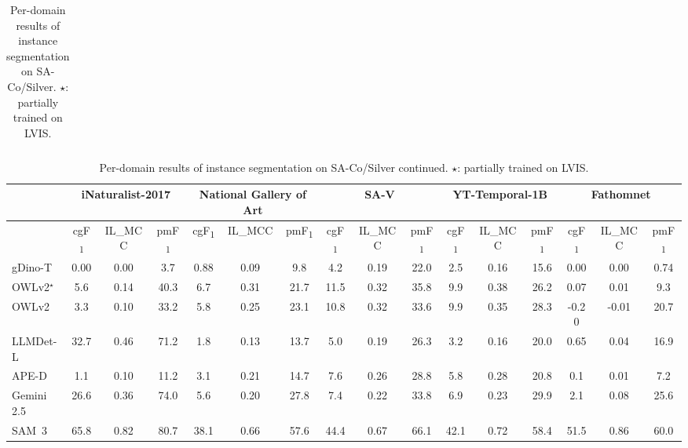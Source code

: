 \documentclass[]{fairmeta}
\newcommand{\model}{SAM~3\xspace}
\newcommand{\dsname}{{SA-Co}\xspace}
\newcommand{\evalsilv}{{\dsname/Silver}\xspace}
\newcommand{\cgf}{cgF\textsubscript{1}\xspace}
\newcommand{\pmf}{pmF\textsubscript{1}\xspace}
\newcommand{\ilmcc}{IL\_MCC\xspace}
\begin{document}
\begin{table}[htbp]
\begin{adjustbox}{max width=\textwidth}
\begin{tabular}{l|ccc|ccc|ccc|ccc|ccc|ccc}
			\hline
		\end{tabular}
	\end{adjustbox}
	\caption{Per-domain results of instance segmentation on \evalsilv. $\star$: partially trained on LVIS.}
	\label{tab:perdomainpcs_silver_part1}
\end{table}

\begin{table}[htbp]
	\centering
	\begin{adjustbox}{max width=\textwidth}
		\renewcommand{\arraystretch}{1.2}
		\setlength{\tabcolsep}{4pt}
		
		\begin{tabular}{l|ccc|ccc|ccc|ccc|ccc}
			\hline
			& \multicolumn{3}{c|}{\textbf{iNaturalist-2017}} 
			& \multicolumn{3}{c|}{\textbf{National Gallery of Art}}
			& \multicolumn{3}{c|}{\textbf{SA-V}}
			& \multicolumn{3}{c|}{\textbf{YT-Temporal-1B}}
			& \multicolumn{3}{c}{\textbf{Fathomnet}} \\
			\hline
			& \cgf & \ilmcc & \pmf 
			& \cgf & \ilmcc & \pmf 
			& \cgf & \ilmcc & \pmf 
			& \cgf & \ilmcc & \pmf 
			& \cgf & \ilmcc & \pmf \\
			\hline
			gDino-T & 0.00 & 0.00 & 3.7 & 0.88 & 0.09 & 9.8 & 4.2 & 0.19 & 22.0 & 2.5 & 0.16 & 15.6 & 0.00 & 0.00 & 0.74 \\
			OWLv2$^\star$ & 5.6 & 0.14 & 40.3 & 6.7 & 0.31 & 21.7 & 11.5 & 0.32 & 35.8 & 9.9 & 0.38 & 26.2 & 0.07 & 0.01 & 9.3 \\
			OWLv2 & 3.3 & 0.10 & 33.2 & 5.8 & 0.25 & 23.1 & 10.8 & 0.32 & 33.6 & 9.9 & 0.35 & 28.3 & -0.20 & -0.01 & 20.7 \\
			LLMDet-L & 32.7 & 0.46 & 71.2 & 1.8 & 0.13 & 13.7 & 5.0 & 0.19 & 26.3 & 3.2 & 0.16 & 20.0 & 0.65 & 0.04 & 16.9 \\
			APE-D & 1.1 & 0.10 & 11.2 & 3.1 & 0.21 & 14.7 & 7.6 & 0.26 & 28.8 & 5.8 & 0.28 & 20.8 & 0.1 & 0.01 & 7.2 \\
			Gemini 2.5 & 26.6 & 0.36 & 74.0 & 5.6 & 0.20 & 27.8 & 7.4 & 0.22 & 33.8 & 6.9 & 0.23 & 29.9 & 2.1 & 0.08 & 25.6 \\
			\model & 65.8 & 0.82 & 80.7 & 38.1 & 0.66 & 57.6 & 44.4 & 0.67 & 66.1 & 42.1 & 0.72 & 58.4 & 51.5 & 0.86 & 60.0 \\
            \hline
		\end{tabular}
	\end{adjustbox}
	\caption{Per-domain results of instance segmentation on \evalsilv continued. $\star$: partially trained on LVIS.}
	\label{tab:perdomainpcs_silver_part2}
\end{table}
\end{document}
